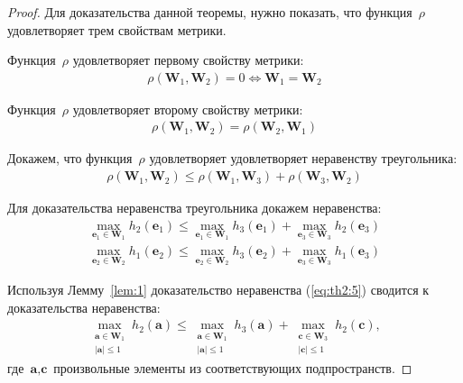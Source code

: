 \begin{proof}
Для доказательства данной теоремы, нужно показать, что функция~$\rho$ удовлетворяет трем свойствам метрики.

Функция~$\rho$ удовлетворяет первому свойству метрики:
\begin{equation}
\label{eq:th2:2}
\begin{aligned}
\rho\left(\textbf{W}_1, \textbf{W}_2\right) = 0 \Leftrightarrow \textbf{W}_1 = \textbf{W}_2
\end{aligned}
\end{equation}

Функция~$\rho$ удовлетворяет второму свойству метрики:
\begin{equation}
\label{eq:th2:3}
\begin{aligned}
\rho\left(\textbf{W}_1, \textbf{W}_2\right) = \rho\left(\textbf{W}_2, \textbf{W}_1\right)
\end{aligned}
\end{equation}

Докажем, что функция~$\rho$ удовлетворяет удовлетворяет неравенству треугольника:
\begin{equation}
\label{eq:th2:4}
\begin{aligned}
\rho\left(\textbf{W}_1, \textbf{W}_2\right) \leq \rho\left(\textbf{W}_1, \textbf{W}_3\right) + \rho\left(\textbf{W}_3, \textbf{W}_2\right)
\end{aligned}
\end{equation}

Для доказательства неравенства треугольника докажем неравенства:
\begin{equation}
\label{eq:th2:5}
\begin{aligned}
\max_{\textbf{e}_1 \in \textbf{W}_1}h_{2}\left(\textbf{e}_1\right) \leq 
\max_{\textbf{e}_1\in \textbf{W}_1}h_{3}\left(\textbf{e}_1\right)+
\max_{\textbf{e}_3 \in \textbf{W}_3}h_{2}\left(\textbf{e}_3\right) \\
\max_{\textbf{e}_2 \in \textbf{W}_2}h_{1}\left(\textbf{e}_2\right) \leq 
\max_{\textbf{e}_2\in \textbf{W}_2}h_{3}\left(\textbf{e}_2\right)+
\max_{\textbf{e}_3 \in \textbf{W}_3}h_{1}\left(\textbf{e}_3\right)
\end{aligned}
\end{equation}

Используя Лемму~\ref{lem:1} доказательство неравенства (\ref{eq:th2:5}) сводится к доказательства неравенства:
\begin{equation}
\label{eq:th2:6}
\begin{aligned}
\max_{\substack{\textbf{a} \in \textbf{W}_1 \\ \left|\textbf{a}\right| \leq 1}}h_{2}\left(\textbf{a}\right) \leq 
\max_{\substack{\textbf{a} \in \textbf{W}_1 \\ \left|\textbf{a}\right| \leq 1}}h_{3}\left(\textbf{a}\right)+
\max_{\substack{\textbf{c} \in \textbf{W}_3 \\ \left|\textbf{c}\right| \leq 1}}h_{2}\left(\textbf{c}\right),
\end{aligned}
\end{equation}
где~$\textbf{a}, \textbf{c}$ произвольные элементы из соответствующих подпространств. 


\end{proof}
